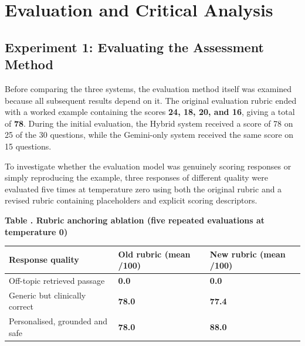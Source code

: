 \section{Evaluation and Critical Analysis}
\label{sec:Evaluation}

\subsection{Experiment 1: Evaluating the Assessment Method}

Before comparing the three systems, the evaluation method itself was examined because all subsequent results depend on it. The original evaluation rubric ended with a worked example containing the scores \textbf{24, 18, 20, and 16}, giving a total of \textbf{78}. During the initial evaluation, the Hybrid system received a score of 78 on 25 of the 30 questions, while the Gemini-only system received the same score on 15 questions.

To investigate whether the evaluation model was genuinely scoring responses or simply reproducing the example, three responses of different quality were evaluated five times at temperature zero using both the original rubric and a revised rubric containing placeholders and explicit scoring descriptors.

\par\medskip
\noindent\begin{minipage}{\textwidth}
\label{tab:4}
\noindent\textbf{Table \thetable. Rubric anchoring ablation (five repeated evaluations at temperature 0)}\par
\medskip
\begin{center}
\small
\setlength{\tabcolsep}{5pt}
\begin{tabular}{>{\raggedright\arraybackslash}p{}>{\centering\arraybackslash}p{}>{\centering\arraybackslash}p{}}
\toprule
\textbf{Response quality} & \textbf{Old rubric (mean /100)} & \textbf{New rubric (mean /100)} \\
\midrule
Off-topic retrieved passage & \textbf{0.0} & \textbf{0.0} \\
Generic but clinically correct & \textbf{78.0} & \textbf{77.4} \\
Personalised, grounded and safe & \textbf{78.0} & \textbf{88.0} \\
\bottomrule
\end{tabular}
\end{center}
\end{minipage}
\par\medskip

